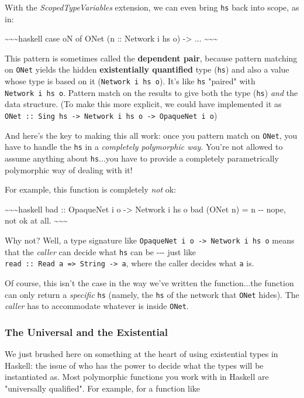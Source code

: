 \documentclass[]{article}
\begin{document}
With the \emph{ScopedTypeVariables} extension, we can even bring \texttt{hs}
back into scope, as in:

\textasciitilde{}\textasciitilde{}\textasciitilde{}haskell case oN of ONet (n ::
Network i hs o) -\textgreater{} ...
\textasciitilde{}\textasciitilde{}\textasciitilde{}

This pattern is sometimes called the \textbf{dependent pair}, because pattern
matching on \texttt{ONet} yields the hidden \textbf{existentially quantified}
type (\texttt{hs}) and also a value whose type is based on it
(\texttt{Network\ i\ hs\ o}). It's like \texttt{hs} "paired" with
\texttt{Network\ i\ hs\ o}. Pattern match on the results to give both the type
(\texttt{hs}) \emph{and} the data structure. (To make this more explicit, we
could have implemented it as
\texttt{ONet\ ::\ Sing\ hs\ -\textgreater{}\ Network\ i\ hs\ o\ -\textgreater{}\ OpaqueNet\ i\ o})

And here's the key to making this all work: once you pattern match on
\texttt{ONet}, you have to handle the \texttt{hs} in a \emph{completely
polymorphic way}. You're not allowed to assume anything about \texttt{hs}...you
have to provide a completely parametrically polymorphic way of dealing with it!

For example, this function is completely \emph{not} ok:

\textasciitilde{}\textasciitilde{}\textasciitilde{}haskell bad :: OpaqueNet i o
-\textgreater{} Network i hs o bad (ONet n) = n -\/- nope, not ok at all.
\textasciitilde{}\textasciitilde{}\textasciitilde{}

Why not? Well, a type signature like
\texttt{OpaqueNet\ i\ o\ -\textgreater{}\ Network\ i\ hs\ o} means that the
\emph{caller} can decide what \texttt{hs} can be -\/-\/- just like
\texttt{read\ ::\ Read\ a\ =\textgreater{}\ String\ -\textgreater{}\ a}, where
the caller decides what \texttt{a} is.

Of course, this isn't the case in the way we've written the function...the
function can only return a \emph{specific} \texttt{hs} (namely, the \texttt{hs}
of the network that \texttt{ONet} hides). The \emph{caller} has to accommodate
whatever is inside \texttt{ONet}.

\subsubsection{The Universal and the Existential}

We just brushed here on something at the heart of using existential types in
Haskell: the issue of who has the power to decide what the types will be
instantiated as. Most polymorphic functions you work with in Haskell are
"universally qualified". For example, for a function like
\end{document}
